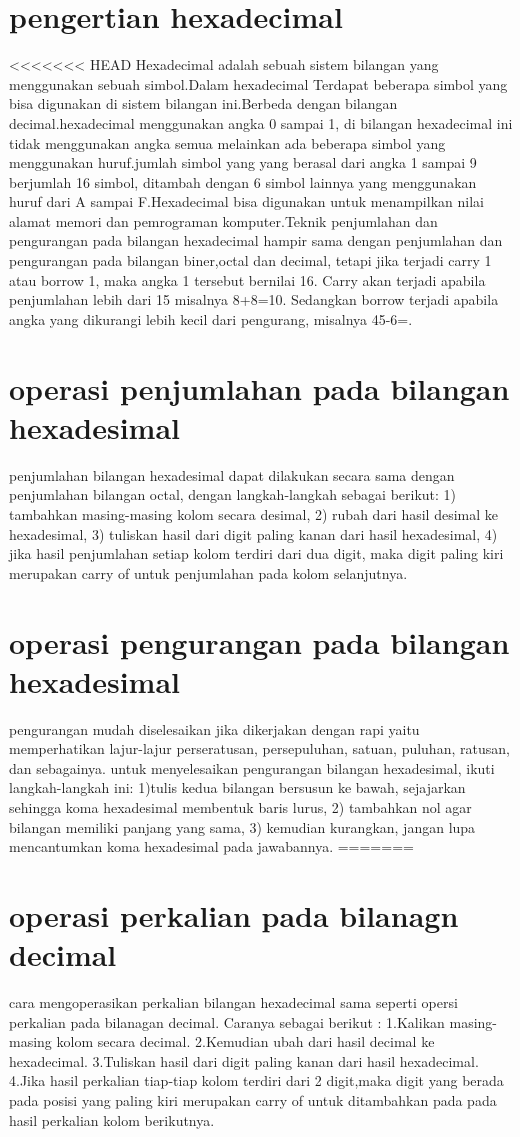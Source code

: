 \section{pengertian hexadecimal}
<<<<<<< HEAD
	Hexadecimal adalah sebuah sistem bilangan yang menggunakan sebuah simbol.Dalam hexadecimal Terdapat beberapa simbol yang bisa digunakan di sistem bilangan ini.Berbeda dengan bilangan decimal.hexadecimal menggunakan angka 0 sampai 1, di bilangan hexadecimal ini tidak menggunakan angka semua melainkan ada beberapa simbol yang menggunakan huruf.jumlah simbol yang yang berasal dari angka 1 sampai 9 berjumlah 16 simbol, ditambah dengan 6 simbol lainnya yang menggunakan huruf dari A sampai F.Hexadecimal bisa digunakan untuk menampilkan nilai alamat memori dan pemrograman komputer.Teknik penjumlahan dan pengurangan pada bilangan hexadecimal hampir sama dengan penjumlahan dan pengurangan pada bilangan biner,octal dan decimal, tetapi jika terjadi carry 1 atau borrow 1, maka angka 1 tersebut bernilai 16. Carry akan terjadi apabila penjumlahan lebih dari 15 misalnya 8+8=10. Sedangkan borrow terjadi apabila angka yang dikurangi lebih kecil dari pengurang, misalnya 45-6=.
\section{operasi penjumlahan pada bilangan hexadesimal}
penjumlahan bilangan hexadesimal dapat dilakukan secara sama dengan penjumlahan bilangan octal, dengan langkah-langkah sebagai berikut: 1) tambahkan masing-masing kolom secara desimal, 2) rubah dari hasil desimal ke hexadesimal, 3) tuliskan hasil dari digit paling kanan dari hasil hexadesimal, 4) jika hasil penjumlahan setiap kolom terdiri dari dua digit, maka digit paling kiri merupakan carry of untuk penjumlahan pada kolom selanjutnya.
\section{operasi pengurangan pada bilangan hexadesimal}
pengurangan mudah diselesaikan jika dikerjakan dengan rapi yaitu memperhatikan lajur-lajur perseratusan, persepuluhan, satuan, puluhan, ratusan, dan sebagainya. untuk menyelesaikan pengurangan bilangan hexadesimal, ikuti langkah-langkah ini: 1)tulis kedua bilangan bersusun ke bawah, sejajarkan sehingga koma hexadesimal membentuk baris lurus, 2) tambahkan nol agar bilangan memiliki panjang yang sama, 3) kemudian kurangkan, jangan lupa mencantumkan koma hexadesimal pada jawabannya.
=======
\section{operasi perkalian pada bilanagn decimal}
cara mengoperasikan perkalian bilangan hexadecimal sama seperti opersi perkalian pada bilanagan decimal. Caranya sebagai berikut :
	1.Kalikan masing-masing kolom secara decimal.
	2.Kemudian ubah dari hasil decimal ke hexadecimal.
	3.Tuliskan hasil dari digit paling kanan dari hasil hexadecimal.
	4.Jika hasil perkalian tiap-tiap kolom terdiri dari 2 digit,maka digit yang berada pada posisi yang paling kiri merupakan carry of untuk ditambahkan pada pada hasil perkalian kolom berikutnya.

